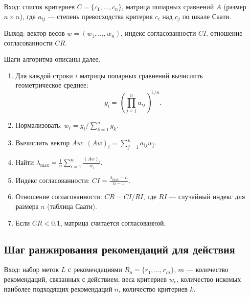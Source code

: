 Вход: список критериев \(C = \{c_1,\dots,c_n\}\), матрица попарных сравнений \(A\) (размер \(n \times n\)), где \(a_{ij}\) --- степень превосходства критерия \(c_i\) над \(c_j\) по шкале Саати.

Выход: вектор весов \(w = (w_1,\dots,w_n)\), индекс согласованности \(CI\), отношение согласованности \(CR\).

Шаги алгоритма описаны далее.
\begin{enumerate}
    \item Для каждой строки \(i\) матрицы попарных сравнений вычислить геометрическое среднее:
    \begin{equation}
    g_i = \left( \prod_{j=1}^{n} a_{ij} \right)^{1/n}.
	\label{eq:vesa}
    \end{equation}
    \item Нормализовать: \(w_i = g_i / \sum_{k=1}^{n} g_k\).
    \item Вычислить вектор \(Aw\): \((Aw)_i = \sum_{j=1}^{n} a_{ij} w_j\).
    \item Найти \(\lambda_{\max} = \frac{1}{n} \sum_{i=1}^{n} \frac{(Aw)_i}{w_i}\).
    \item Индекс согласованности: \(CI = \frac{\lambda_{\max} - n}{n-1}\).
    \item Отношение согласованности: \(CR = CI / RI\), где \(RI\) --- случайный индекс для размера \(n\) (таблица Саати).
    \item Если \(CR < 0.1\), матрица считается согласованной.
\end{enumerate}

\subsection*{Шаг ранжирования рекомендаций для действия}

    Вход: набор меток \(L\) с рекомендациями \(R_a = \{r_1,\dots,r_m\}\), $m$ --- количество рекомендаций, связанных с действием, веса критериев \(w_c\), количество искомых наиболее подходящих рекомендаций $n$, количество критериев $k$.

